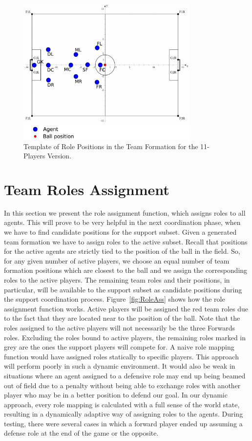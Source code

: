 \begin{figure}[t!]
\centering
  \includegraphics[width=0.8\textwidth]{Chapter4/figures/Formation11_0.pdf}
  \caption{Template of Role Positions in the Team Formation for the 11-Players Version.} 
  \label{fig:Formation11_0}
\end{figure}

\section{Team Roles Assignment}
In this section we present the role assignment function, which assigns roles to all agents. This will prove to be very helpful in the next coordination phase, when we have to find candidate positions for the support subset. Given a generated team formation we have to assign roles to the active subset. Recall that positions for the active agents are strictly tied to the position of the ball in the field. So, for any given number of active players, we choose an equal number of team formation positions which are closest to the ball and we assign the corresponding roles to the active players. The remaining team roles and their positions, in particular, will be available to the support subset as candidate positions during the support coordination process. Figure~\ref{fig:RoleAss} shows how the role assignment function works. Active players will be assigned the red team roles due to the fact that they are located near to the position of the ball. Note that the roles assigned to the active players will not necessarily be the three Forwards roles. Excluding the roles bound to active players, the remaining roles marked in grey are the ones the support players will compete for. A naive role mapping function would have assigned roles statically to specific players. This approach will perform poorly in such a dynamic environment. It would also be weak in situations where an agent assigned to a defensive role may end up being beamed out of field due to a penalty without being able to exchange roles with another player who may be in a better position to defend our goal. In our dynamic approach, every role mapping is calculated with a full sense of the world state, resulting in a dynamically adaptive way of assigning roles to the agents. During testing, there were several cases in which a forward player ended up assuming a defense role at the end of the game or the opposite.


